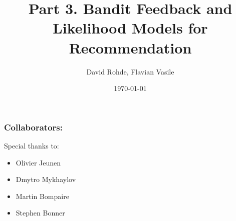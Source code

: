 \documentclass[10pt]{beamer}
\title{Part 3. Bandit Feedback and Likelihood Models for Recommendation}
\date{\today}
\author{David Rohde, Flavian Vasile}
\institute{Criteo Research}
\begin{document}
\maketitle

\begin{frame}
\frametitle{Collaborators:}

Special thanks to:
\begin{itemize}
    \item Olivier Jeunen
    \item Dmytro Mykhaylov
    \item Martin Bompaire
    \item Stephen Bonner
\end{itemize}

\end{frame}







%
%
%
%
%
%
%
%
%


\end{document}
